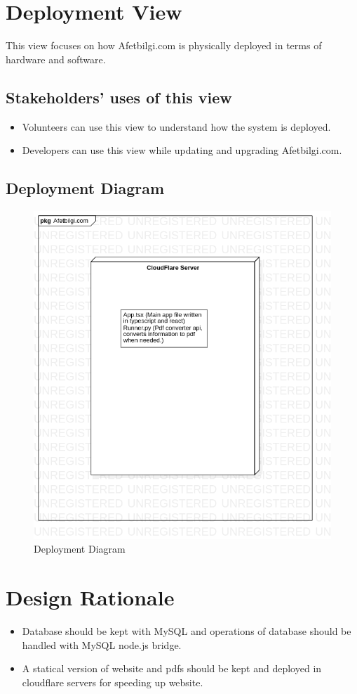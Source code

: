 \section{Deployment View}
This view focuses on how Afetbilgi.com is physically deployed in terms of hardware and software.

\subsection{Stakeholders' uses of this view}
\begin{itemize}
    \item Volunteers can use this view to understand how the system is deployed.
    \item Developers can use this view while updating and upgrading Afetbilgi.com.
\end{itemize}

\subsection{Deployment Diagram}
\begin{figure}[H]
    \includegraphics[scale = 0.5]{assets/DeploymentDiagram1.png}
    \caption[Deployment Diagram]{Deployment Diagram}
\end{figure}

\section{Design Rationale}

\begin{itemize}
    \item Database should be kept with MySQL and operations of database should be handled with MySQL node.js bridge.
    \item A statical version of website and pdfs should be kept and deployed in cloudflare servers for speeding up website.
\end{itemize}